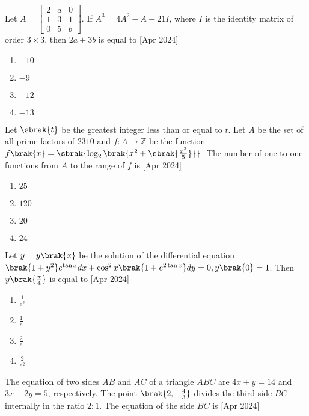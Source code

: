 	\item Let $A=\begin{bmatrix}
			2 & a & 0 \\
			1 & 3 & 1 \\
			0 & 5 & b 
			\end{bmatrix}$. If $A^3=4A^2-A-21I$, where $I$ is the identity matrix of order $3\times3$, then $2a+3b$ is equal to \hfill{[Apr 2024]}
			\begin{enumerate}
				\item $-10$\\
				\item $-9$\\
				\item $-12$\\
				\item $-13$\\
			\end{enumerate}
	\item Let $\sbrak{t}$ be the greatest integer less than or equal to $t$. Let $A$ be the set of all prime factors of $2310$ and $f:A\to\mathbb{Z}$ be the function $f\brak{x}=\sbrak{\log_2\brak{x^2+\sbrak{\frac{x^3}{5}}}}$. The number of one-to-one functions from $A$ to the range of $f$ is  \hfill{[Apr 2024]}
		\begin{enumerate}
			\item $25$\\
			\item $120$\\
			\item $20$\\
			\item $24$\\
		\end{enumerate}
	\item Let $y=y\brak{x}$ be the solution of the differential equation $\brak{1+y^2}e^{\tan{x}}dx+\cos^2{x}\brak{1+e^{2\tan{x}}}dy=0,y\brak{0}=1$. Then $y\brak{\frac{\pi}{4}}$ is equal to \hfill{[Apr 2024]}
		\begin{enumerate}
			\item $\frac{1}{e^2}$\\
			\item $\frac{1}{e}$\\
			\item $\frac{2}{e}$\\
			\item $\frac{2}{e^2}$\\
		\end{enumerate}
	\item The equation of two sides $AB$ and $AC$ of a triangle $ABC$ are $4x+y=14$ and $3x-2y=5$, respectively. The point $\brak{2,-\frac{4}{3}}$ divides the third side $BC$ internally in the ratio $2:1$. The equation of the side $BC$ is \hfill{[Apr 2024]}
